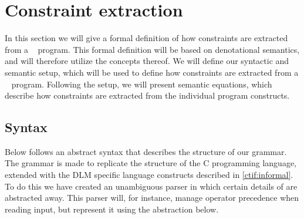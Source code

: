 
\section{Constraint extraction}\label{extraction}
In this section we will give a formal definition of how constraints are extracted from a \thelang~ program.
This formal definition will be based on denotational semantics, and will therefore utilize the concepts thereof.
We will define our syntactic and semantic setup, which will be used to define how constraints are extracted from a \thelang~ program.
Following the setup, we will present semantic equations, which describe how constraints are extracted from the individual program constructs.

\subsection{Syntax}
Below follows an abstract syntax that describes the structure of our grammar.
The grammar is made to replicate the structure of the C programming language, extended with the DLM specific language constructs described in \cref{ctif:informal}.
To do this we have created an unambiguous parser in which certain details of are abstracted away.
This parser will, for instance, manage operator precedence when reading input, but represent it using the abstraction below.

